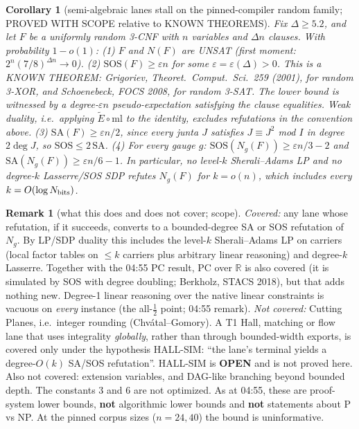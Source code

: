 \documentclass[11pt]{article}
\newtheorem{corollary}[theorem]{Corollary}
\theoremstyle{definition}
\newtheorem{remark}[theorem]{Remark}
\newcommand{\SOS}{\mathrm{SOS}}
\newcommand{\SA}{\mathrm{SA}}
\newcommand{\ml}{\mathrm{ml}}
\begin{document}
\begin{corollary}[semi-algebraic lanes stall on the pinned-compiler random family; PROVED WITH SCOPE relative to KNOWN THEOREMS]\label{cor:sos}
Fix $\Delta\ge5.2$, and let $F$ be a uniformly random 3-CNF with $n$ variables and $\Delta n$ clauses. With probability $1-o(1)$:
(1) $F$ and $N(F)$ are UNSAT (first moment: $2^n(7/8)^{\Delta n}\to0$).
(2) $\SOS(F)\ge\varepsilon n$ for some $\varepsilon=\varepsilon(\Delta)>0$. This is a KNOWN THEOREM: Grigoriev, Theoret.\ Comput.\ Sci.\ 259 (2001), for random 3-XOR, and Schoenebeck, FOCS 2008, for random 3-SAT. The lower bound is witnessed by a degree-$\varepsilon n$ pseudo-expectation satisfying the clause equalities. Weak duality, i.e.\ applying $\tilde E\circ\ml$ to the identity, excludes refutations in the convention above.
(3) $\SA(F)\ge\varepsilon n/2$, since every junta $J$ satisfies $J\equiv J^2$ mod $I$ in degree $2\deg J$, so $\SOS\le2\,\SA$.
(4) For every gauge $g$: $\SOS(N_g(F))\ge\varepsilon n/3-2$ and $\SA(N_g(F))\ge\varepsilon n/6-1$. In particular, no level-$k$ Sherali--Adams LP and no degree-$k$ Lasserre/SOS SDP refutes $N_g(F)$ for $k=o(n)$, which includes every $k=O(\log N_{\rm bits})$.
\end{corollary}

\begin{remark}[what this does and does not cover; scope]
\emph{Covered:} any lane whose refutation, if it succeeds, converts to a bounded-degree SA or SOS refutation of $N_g$. By LP/SDP duality this includes the level-$k$ Sherali--Adams LP on carriers (local factor tables on $\le k$ carriers plus arbitrary linear reasoning) and degree-$k$ Lasserre. Together with the 04:55 PC result, PC over $\mathbb R$ is also covered (it is simulated by SOS with degree doubling; Berkholz, STACS 2018), but that adds nothing new. Degree-1 linear reasoning over the native linear constraints is vacuous on \emph{every} instance (the all-$\tfrac12$ point; 04:55 remark).
\emph{Not covered:} Cutting Planes, i.e.\ integer rounding (Chv\'atal--Gomory). A T1 Hall, matching or flow lane that uses integrality \emph{globally}, rather than through bounded-width exports, is covered only under the hypothesis HALL-SIM: ``the lane's terminal yields a degree-$O(k)$ SA/SOS refutation''. HALL-SIM is \textbf{OPEN} and is not proved here. Also not covered: extension variables, and DAG-like branching beyond bounded depth. The constants $3$ and $6$ are not optimized. As at 04:55, these are proof-system lower bounds, \textbf{not} algorithmic lower bounds and \textbf{not} statements about P vs NP. At the pinned corpus sizes ($n=24,40$) the bound is uninformative.
\end{remark}
\end{document}
